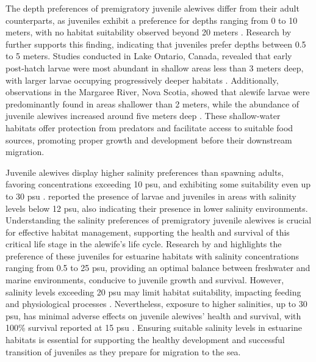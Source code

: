 \documentclass[
]{book}
\begin{document}
The depth preferences of premigratory juvenile alewives differ from their adult counterparts, as juveniles exhibit a preference for depths ranging from 0 to 10 meters, with no habitat suitability observed beyond 20 meters \citep{brown_habitat_2000, hook_annual_2008}. Research by \citet{pardue_habitat_1983} further supports this finding, indicating that juveniles prefer depths between 0.5 to 5 meters. Studies conducted in Lake Ontario, Canada, revealed that early post-hatch larvae were most abundant in shallow areas less than 3 meters deep, with larger larvae occupying progressively deeper habitats \citep{ingel_habitat_2013}. Additionally, observations in the Margaree River, Nova Scotia, showed that alewife larvae were predominantly found in areas shallower than 2 meters, while the abundance of juvenile alewives increased around five meters deep \citep{gibson_statistical_2003}. These shallow-water habitats offer protection from predators and facilitate access to suitable food sources, promoting proper growth and development before their downstream migration.

Juvenile alewives display higher salinity preferences than spawning adults, favoring concentrations exceeding 10 psu, and exhibiting some suitability even up to 30 psu \citep{brown_habitat_2000, pardue_habitat_1983}. \citet{fay_alewifeblueback_1983} reported the presence of larvae and juveniles in areas with salinity levels below 12 psu, also indicating their presence in lower salinity environments. Understanding the salinity preferences of premigratory juvenile alewives is crucial for effective habitat management, supporting the health and survival of this critical life stage in the alewife's life cycle. Research by \citet{turner_juvenile_2016} and \citet{able_alewife_2020} highlights the preference of these juveniles for estuarine habitats with salinity concentrations ranging from 0.5 to 25 psu, providing an optimal balance between freshwater and marine environments, conducive to juvenile growth and survival. However, salinity levels exceeding 20 psu may limit habitat suitability, impacting feeding and physiological processes \citep{fabrizio_extent_2021}. Nevertheless, exposure to higher salinities, up to 30 psu, has minimal adverse effects on juvenile alewives' health and survival, with 100\% survival reported at 15 psu \citep{dimaggio_spawning_2015}. Ensuring suitable salinity levels in estuarine habitats is essential for supporting the healthy development and successful transition of juveniles as they prepare for migration to the sea.
\end{document}
